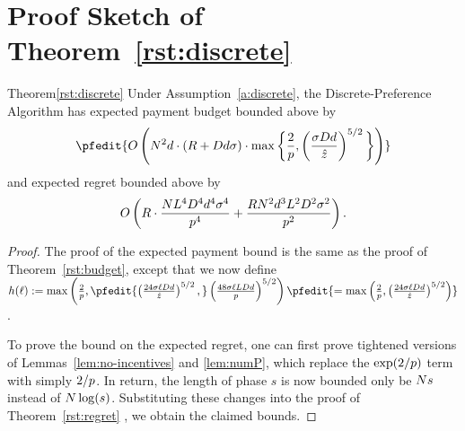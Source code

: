 \section{Proof Sketch of Theorem~\ref{rst:discrete}}
\label{sec:discussion-proof1}

\begin{rtheorem}{Theorem}{\ref{rst:discrete}}
Under Assumption~\ref{a:discrete}, the Discrete-Preference Algorithm has expected payment budget bounded above by 
\begin{align*}
\pfedit{
O \left(\ARMNUM^2  d \cdot (\MAXR + \Diam d \sigma)\cdot
    \max\bigg\{\frac{2}{p},
    \left( \frac{\sigma \Diam d}{\TieCutoff} \right)^{5/2}
    \bigg\}
\right)
}
\end{align*}
and expected regret bounded above by 
\begin{align}
O \left(R\cdot \frac{N L^4 D^4 d^4 \sigma^4}{p^4}
  + \frac{R N^2 d^3 L^2 D^2 \sigma^2}{p^2}
  \right).  \nonumber
\end{align}
\end{rtheorem}

\begin{proof}
The proof of the expected payment bound is the same as the proof of Theorem~\ref{rst:budget}, except that we now define $h(\ell) := \max \left( \frac{2}{\MinProb},
\pfedit{
\left( \frac{24 \sigma \ell \Diam d}{\TieCutoff} \right)^{5/2},
}
\left( \frac{48 \sigma \ell \TieDensity \Diam d}{\MinProb} \right)^{5/2}
\right)
\pfedit{
= 
\max \left( \frac{2}{\MinProb},
\left( \frac{24 \sigma \ell \Diam d}{\TieCutoff} \right)^{5/2}
\right)
}
$.

To prove the bound on the expected regret, one can first prove tightened versions of Lemmas~\ref{lem:no-incentives} and \ref{lem:numP},
which replace the $\exp(2/p)$ term with simply $2/p$.
In return, the length of phase $s$ is now bounded only be $N s$ instead of $N \log(s)$.
Substituting these changes into the proof of Theorem~\ref{rst:regret} , we obtain the claimed bounds.



\end{proof}

